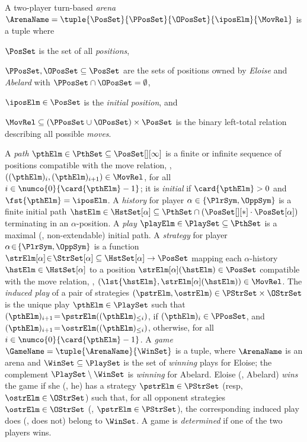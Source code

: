 \documentclass[authoryear]{elsarticle}
\begin{document}
A two-player turn-based \emph{arena} $\ArenaName = \tuple {\PosSet} {\PPosSet}
{\OPosSet} {\iposElm} {\MovRel}$ is a tuple where
\begin{inparaenum}[(i)]
  \item
    $\PosSet$ is the set of all \emph{positions},
  \item
    $\PPosSet, \OPosSet \subseteq \PosSet$ are the sets of positions owned by
    \emph{Eloise} and \emph{Abelard} with $\PPosSet \cap \OPosSet = \emptyset$,
  \item
    $\iposElm \in \PosSet$ is the \emph{initial position}, and
  \item
    $\MovRel \subseteq (\PPosSet \cup \OPosSet) \times \PosSet$ is the binary
    left-total relation describing all possible \emph{moves}.
\end{inparaenum}
%
A \emph{path} $\pthElm \in \PthSet \subseteq \PosSet[][\infty]$ is a finite or
infinite sequence of positions compatible with the move relation, \ie,
$((\pthElm)_{i}, (\pthElm)_{i + 1}) \in \MovRel$, for all $i \in
\numco{0}{\card{\pthElm} - 1}$; it is \emph{initial} if $\card{\pthElm} > 0$ and
$\fst{\pthElm} = \iposElm$.
%
A \emph{history} for player $\alpha \in \{ \PlrSym, \OppSym \}$ is a finite
initial path $\hstElm \in \HstSet[\alpha] \subseteq \PthSet \cap (\PosSet[][*]
\cdot \PosSet[\alpha])$ terminating in an $\alpha$-position.
%
A \emph{play} $\playElm \in \PlaySet \subseteq \PthSet$ is a maximal (\ie,
non-extendable) initial path.
%
A \emph{strategy} for player $\alpha \!\in\! \{ \PlrSym, \OppSym \}$ is a
function $\strElm[\alpha] \!\in\! \StrSet[\alpha] \subseteq {\HstSet[\alpha] \to
\PosSet}$ mapping each $\alpha$-history $\hstElm \in \HstSet[\alpha]$ to a
position ${\strElm[\alpha](\hstElm) \in \PosSet}$ compatible with the move
relation, \ie, $(\lst{\hstElm}, \strElm[\alpha](\hstElm)) \in \MovRel$.
%
The \emph{induced play} of a pair of strategies $(\pstrElm, \ostrElm) \in
\PStrSet \times \OStrSet$ is the unique play $\pthElm \in \PlaySet$ such that
$(\pthElm)_{i + 1} \!=\! \pstrElm((\pthElm)_{\leq i})$, if $(\pthElm)_{i} \in
\PPosSet$, and $(\pthElm)_{i + 1} \!=\! \ostrElm((\pthElm)_{\leq i})$,
otherwise, for all $i \in \numco{0}{\card{\pthElm} - 1}$.
%
A \emph{game} $\GameName = \tuple {\ArenaName} {\WinSet}$ is a tuple, where
$\ArenaName$ is an arena and $\WinSet \subseteq \PlaySet$ is the set of
\emph{winning} plays for Eloise; the complement $\PlaySet \setminus \WinSet$ is
\emph{winning} for Abelard.
%
Eloise (\resp, Abelard) \emph{wins} the game if she (\resp, he) has a strategy
$\pstrElm \in \PStrSet$ (resp, $\ostrElm \in \OStrSet$) such that, for all
opponent strategies $\ostrElm \in \OStrSet$ (\resp, $\pstrElm \in \PStrSet$),
the corresponding induced play does (\resp, does not) belong to $\WinSet$.
A game is \emph{determined} if one of the two players wins.
\end{document}
